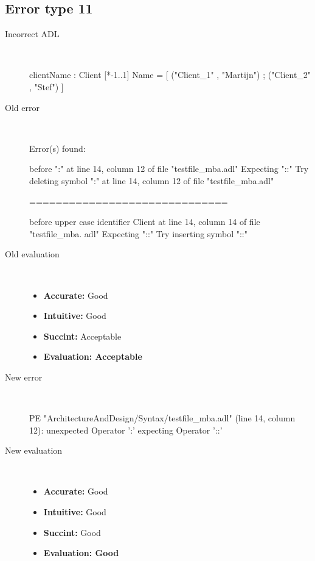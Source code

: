 \subsection{Error type 11}
  \begin{description}
  \item[Incorrect ADL]~\\
\begin{adl}
clientName : Client [*-1..1] Name =
    [ ("Client_1"      , "Martijn")
    ; ("Client_2"      , "Stef")
    ]\end{adl}
  \item[Old error]~\\
\begin{haskell}
Error(s) found:

before ":" at line 14, column 12 of file "testfile_mba.adl"
Expecting "::"
Try deleting symbol ":" at line 14, column 12 of file "testfile_mba.adl"

==============================

before upper case identifier Client at line 14, column 14 of file "testfile_mba.
adl"
Expecting "::"
Try inserting symbol "::"\end{haskell}
  \item[Old evaluation]~\\
    \begin{itemize}
    \item \textbf{Accurate:} Good
    \item \textbf{Intuitive:} Good
    \item \textbf{Succint:} Acceptable
    \item \textbf{Evaluation: Acceptable}
    \end{itemize}
  \item[New error]~\\
\begin{haskell}
PE "ArchitectureAndDesign/Syntax/testfile_mba.adl" (line 14, column 12):
unexpected Operator ':'
expecting Operator '::'\end{haskell}
  \item[New evaluation]~\\
    \begin{itemize}
    \item \textbf{Accurate:} Good
    \item \textbf{Intuitive:} Good
    \item \textbf{Succint:} Good
    \item \textbf{Evaluation: Good
}
    \end{itemize}
  \end{description}

